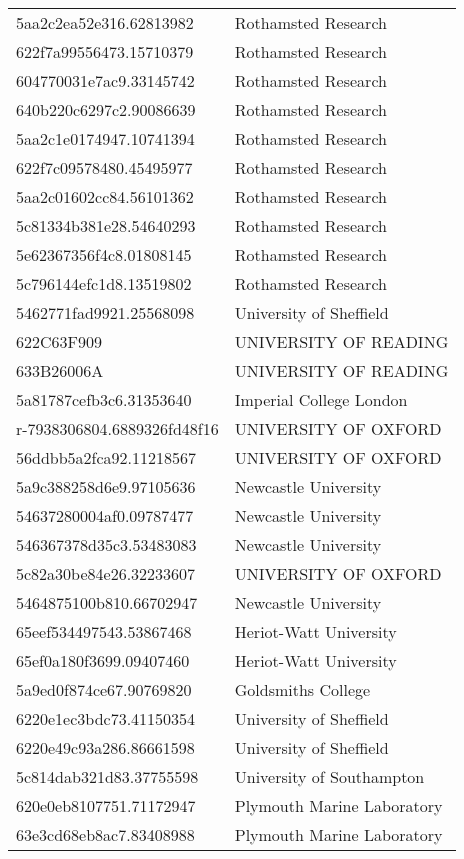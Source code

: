 \begin{tabular}{ll}
5aa2c2ea52e316.62813982 & Rothamsted Research \\
622f7a99556473.15710379 & Rothamsted Research \\
604770031e7ac9.33145742 & Rothamsted Research \\
640b220c6297c2.90086639 & Rothamsted Research \\
5aa2c1e0174947.10741394 & Rothamsted Research \\
622f7c09578480.45495977 & Rothamsted Research \\
5aa2c01602cc84.56101362 & Rothamsted Research \\
5c81334b381e28.54640293 & Rothamsted Research \\
5e62367356f4c8.01808145 & Rothamsted Research \\
5c796144efc1d8.13519802 & Rothamsted Research \\
5462771fad9921.25568098 & University of Sheffield \\
622C63F909 & UNIVERSITY OF READING \\
633B26006A & UNIVERSITY OF READING \\
5a81787cefb3c6.31353640 & Imperial College London \\
r-7938306804.6889326fd48f16 & UNIVERSITY OF OXFORD \\
56ddbb5a2fca92.11218567 & UNIVERSITY OF OXFORD \\
5a9c388258d6e9.97105636 & Newcastle University \\
54637280004af0.09787477 & Newcastle University \\
546367378d35c3.53483083 & Newcastle University \\
5c82a30be84e26.32233607 & UNIVERSITY OF OXFORD \\
5464875100b810.66702947 & Newcastle University \\
65eef534497543.53867468 & Heriot-Watt University \\
65ef0a180f3699.09407460 & Heriot-Watt University \\
5a9ed0f874ce67.90769820 & Goldsmiths College \\
6220e1ec3bdc73.41150354 & University of Sheffield \\
6220e49c93a286.86661598 & University of Sheffield \\
5c814dab321d83.37755598 & University of Southampton \\
620e0eb8107751.71172947 & Plymouth Marine Laboratory \\
63e3cd68eb8ac7.83408988 & Plymouth Marine Laboratory \\

\end{tabular}
